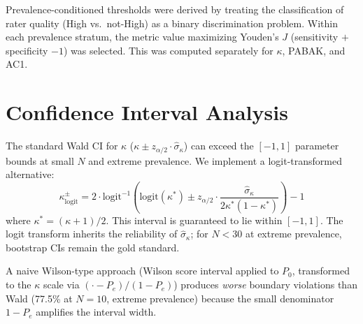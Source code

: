 \documentclass[11pt]{article}
\begin{document}
Prevalence-conditioned thresholds were derived by treating the classification of rater quality (High vs.\ not-High) as a binary discrimination problem. Within each prevalence stratum, the metric value maximizing Youden's $J$ (sensitivity $+$ specificity $- 1$) was selected. This was computed separately for $\kappa$, PABAK, and AC1.

\newpage
\section{Confidence Interval Analysis}
\label{app:ci}

The standard Wald CI for $\kappa$ ($\kappa \pm z_{\alpha/2} \cdot \hat{\sigma}_\kappa$) can exceed the $[-1,1]$ parameter bounds at small $N$ and extreme prevalence. We implement a logit-transformed alternative:
\begin{equation}
\kappa_{\text{logit}}^{\pm} = 2 \cdot \text{logit}^{-1}\!\left(\text{logit}(\kappa^*) \pm z_{\alpha/2} \cdot \frac{\hat{\sigma}_\kappa}{2\kappa^*(1 - \kappa^*)}\right) - 1
\label{eq:logit_ci}
\end{equation}
where $\kappa^* = (\kappa + 1)/2$. This interval is guaranteed to lie within $[-1,1]$. The logit transform inherits the reliability of $\hat{\sigma}_\kappa$; for $N < 30$ at extreme prevalence, bootstrap CIs remain the gold standard.

A naive Wilson-type approach (Wilson score interval applied to $P_0$, transformed to the $\kappa$ scale via $(\cdot - P_e)/(1-P_e)$) produces \textit{worse} boundary violations than Wald (77.5\% at $N=10$, extreme prevalence) because the small denominator $1 - P_e$ amplifies the interval width.
\end{document}
